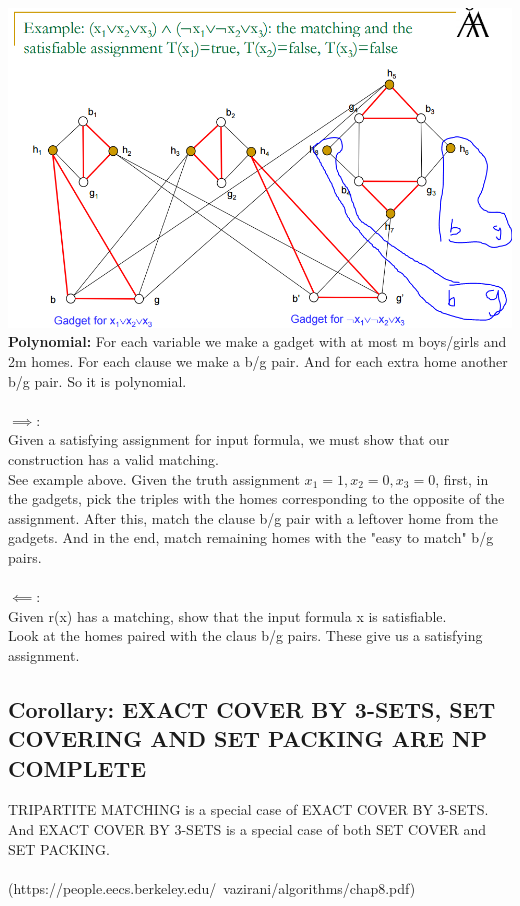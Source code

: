 \includegraphics[scale=0.5]{tripartite}
\\
\textbf{Polynomial:} For each variable we make a gadget with at most m boys/girls and 2m homes. For each clause we make a b/g pair. And for each extra home another b/g pair. So it is polynomial.
\\\\
$\implies:$ \\ 
Given a satisfying assignment for input formula, we must show that our construction has a valid matching.\\
See example above. Given the truth assignment $x_1 = 1, x_2 = 0, x_3 = 0$, first, in the gadgets, pick the triples with the homes corresponding to the opposite of the assignment. After this, match the clause b/g pair with a leftover home from the gadgets. And in the end, match remaining homes with the "easy to match" b/g pairs.  
\\\\ 
$\impliedby:$ \\  
Given r(x) has a matching, show that the input formula x is satisfiable.\\
Look at the homes paired with the claus b/g pairs. These give us a satisfying assignment.
\newpage
\subsection{Corollary: EXACT COVER BY 3-SETS, SET COVERING AND SET PACKING ARE NP COMPLETE}
TRIPARTITE MATCHING is a special case of EXACT COVER BY 3-SETS. And EXACT COVER BY 3-SETS is a special case of both SET COVER and SET PACKING.\\\\ (https://people.eecs.berkeley.edu/~vazirani/algorithms/chap8.pdf)
